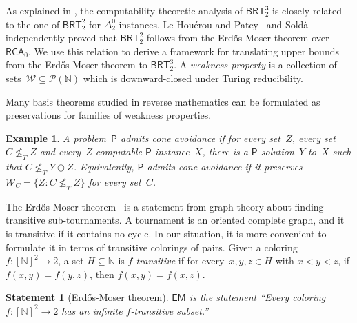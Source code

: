 \documentclass{article}
\newcommand{\Psf}{\mathsf{P}}
\def\W{\mathcal{W}}
\def\P{\mathcal{P}}
\newcommand{\RCA}[0]{\mathsf{RCA}}
\newcommand{\EM}[0]{\mathsf{EM}}
\newcommand{\BRT}[0]{\mathsf{BRT}}
\newcommand{\NN}[0]{\mathbb{N}}
\def\qt#1{``#1''}%
\newtheorem*{statement}{Statement}
\numberwithin{theorem}{section}
\newtheorem{definition}[theorem]{Definition}
\newtheorem{example}[theorem]{Example}
\begin{document}
As explained in , the computability-theoretic analysis of $\BRT^3_2$ is closely related to the one of $\BRT^2_2$ for $\Delta^0_2$ instances. Le Houérou and Patey~\cite{houerou2025reverse} and Sold\`a~\cite[Section 4.1]{solda2021calibrating} independently proved that $\BRT^2_2$ follows from the Erd\H{o}s-Moser theorem over~$\RCA_0$. We use this relation to derive a framework for translating upper bounds from the Erd\H{o}s-Moser theorem to $\BRT^3_2$. A \emph{weakness property} is a collection of sets~$\W \subseteq \P(\NN)$ which is downward-closed under Turing reducibility.


Many basis theorems studied in reverse mathematics can be formulated as preservations for families of weakness properties.

\begin{example}
A problem~$\Psf$ admits \emph{cone avoidance} if for every set~$Z$, every set~$C \not \leq_T Z$ and every~$Z$-computable $\Psf$-instance~$X$, there is a $\Psf$-solution~$Y$ to~$X$ such that $C \not \leq_T Y \oplus Z$.
Equivalently, $\Psf$ admits cone avoidance if it preserves $\W_C = \{ Z : C \not \leq_T Z \}$ for every set~$C$.
\end{example}

The Erd\H{o}s-Moser theorem~\cite{erdhos_representation_1964} is a statement from graph theory about finding transitive sub-tournaments. A tournament is an oriented complete graph, and it is transitive if it contains no cycle. In our situation, it is more convenient to formulate it in terms of transitive colorings of pairs. Given a coloring $f : [\NN]^2 \to 2$, a set $H \subseteq \NN$ is \emph{$f$-transitive} if for every~$x, y, z \in H$ with $x < y < z$, if $f(x, y) = f(y, z)$, then $f(x, y) = f(x, z)$.

\begin{statement}[Erd\H{o}s-Moser theorem]
$\EM$ is the statement \qt{Every coloring $f : [\NN]^2 \to 2$ has an infinite $f$-transitive subset.}
\end{statement}
\end{document}
